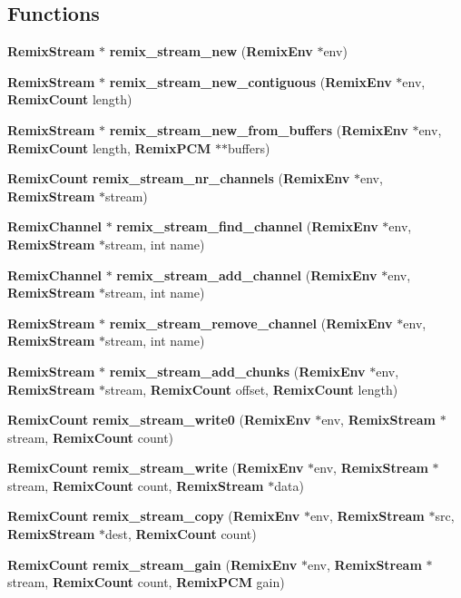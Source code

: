 \subsection*{Functions}
\begin{CompactItemize}
\item 
{\bf Remix\-Stream} $\ast$ {\bf remix\_\-stream\_\-new} ({\bf Remix\-Env} $\ast$env)
\item 
{\bf Remix\-Stream} $\ast$ {\bf remix\_\-stream\_\-new\_\-contiguous} ({\bf Remix\-Env} $\ast$env, {\bf Remix\-Count} length)
\item 
{\bf Remix\-Stream} $\ast$ {\bf remix\_\-stream\_\-new\_\-from\_\-buffers} ({\bf Remix\-Env} $\ast$env, {\bf Remix\-Count} length, {\bf Remix\-PCM} $\ast$$\ast$buffers)
\item 
{\bf Remix\-Count} {\bf remix\_\-stream\_\-nr\_\-channels} ({\bf Remix\-Env} $\ast$env, {\bf Remix\-Stream} $\ast$stream)
\item 
{\bf Remix\-Channel} $\ast$ {\bf remix\_\-stream\_\-find\_\-channel} ({\bf Remix\-Env} $\ast$env, {\bf Remix\-Stream} $\ast$stream, int name)
\item 
{\bf Remix\-Channel} $\ast$ {\bf remix\_\-stream\_\-add\_\-channel} ({\bf Remix\-Env} $\ast$env, {\bf Remix\-Stream} $\ast$stream, int name)
\item 
{\bf Remix\-Stream} $\ast$ {\bf remix\_\-stream\_\-remove\_\-channel} ({\bf Remix\-Env} $\ast$env, {\bf Remix\-Stream} $\ast$stream, int name)
\item 
{\bf Remix\-Stream} $\ast$ {\bf remix\_\-stream\_\-add\_\-chunks} ({\bf Remix\-Env} $\ast$env, {\bf Remix\-Stream} $\ast$stream, {\bf Remix\-Count} offset, {\bf Remix\-Count} length)
\item 
{\bf Remix\-Count} {\bf remix\_\-stream\_\-write0} ({\bf Remix\-Env} $\ast$env, {\bf Remix\-Stream} $\ast$stream, {\bf Remix\-Count} count)
\item 
{\bf Remix\-Count} {\bf remix\_\-stream\_\-write} ({\bf Remix\-Env} $\ast$env, {\bf Remix\-Stream} $\ast$stream, {\bf Remix\-Count} count, {\bf Remix\-Stream} $\ast$data)
\item 
{\bf Remix\-Count} {\bf remix\_\-stream\_\-copy} ({\bf Remix\-Env} $\ast$env, {\bf Remix\-Stream} $\ast$src, {\bf Remix\-Stream} $\ast$dest, {\bf Remix\-Count} count)
\item 
{\bf Remix\-Count} {\bf remix\_\-stream\_\-gain} ({\bf Remix\-Env} $\ast$env, {\bf Remix\-Stream} $\ast$stream, {\bf Remix\-Count} count, {\bf Remix\-PCM} gain)
\item 
$$
\end{CompactItemize}
